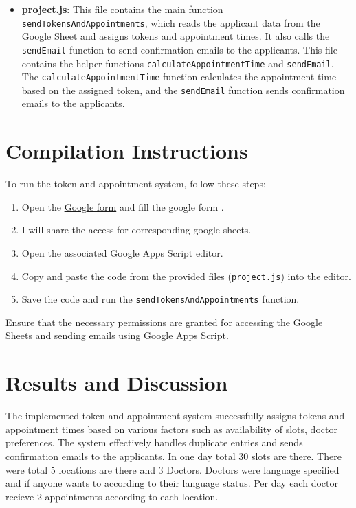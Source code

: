 \documentclass[a4paper, 12pt]{article}
\begin{document}
\begin{itemize}
    \item \textbf{project.js}: This file contains the main function \texttt{sendTokensAndAppointments}, which reads the applicant data from the Google Sheet and assigns tokens and appointment times. It also calls the \texttt{sendEmail} function to send confirmation emails to the applicants. This file contains the helper functions \texttt{calculateAppointmentTime} and \texttt{sendEmail}. The \texttt{calculateAppointmentTime} function calculates the appointment time based on the assigned token, and the \texttt{sendEmail} function sends confirmation emails to the applicants.
\end{itemize}

\section{Compilation Instructions}
To run the token and appointment system, follow these steps:

\begin{enumerate}
        \item Open the \href{https://docs.google.com/forms/d/1leXHz78FbQy1tpDOleCEDMf7cOMTbkC0G1rB3kum_JU/edit}{Google form} and fill the google form .
        \item I will share the access for corresponding google sheets.
    \item Open the associated Google Apps Script editor.
    \item Copy and paste the code from the provided files (\texttt{project.js}) into the editor.
    \item Save the code and run the \texttt{sendTokensAndAppointments} function.
\end{enumerate}

Ensure that the necessary permissions are granted for accessing the Google Sheets and sending emails using Google Apps Script.

\section{Results and Discussion}
The implemented token and appointment system successfully assigns tokens and appointment times based on various factors such as availability of slots, doctor preferences. The system effectively handles duplicate entries and sends confirmation emails to the applicants. In one day total 30 slots are there. There were total 5 locations are there and 3 Doctors. Doctors were language specified and if anyone wants to according to their language status. Per day each doctor recieve 2 appointments according to each location.
\end{document}
